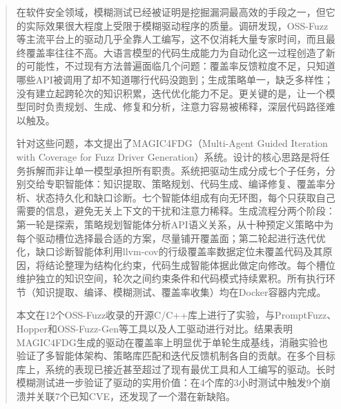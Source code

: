 \documentclass[
    fontset = mac %
  ]{njuthesis}
\begin{document}

\maketitle

\raggedbottom

\begin{abstract}
在软件安全领域，模糊测试已经被证明是挖掘漏洞最高效的手段之一，但它的实际效果很大程度上受限于模糊驱动程序的质量。调研发现，OSS-Fuzz等主流平台上的驱动几乎全靠人工编写，这不仅消耗大量专家时间，而且最终覆盖率往往不高。大语言模型的代码生成能力为自动化这一过程创造了新的可能性，不过现有方法普遍面临几个问题：覆盖率反馈粒度不足，只知道哪些API被调用了却不知道哪行代码没跑到；生成策略单一，缺乏多样性；没有建立起跨轮次的知识积累，迭代优化能力不足。更关键的是，让一个模型同时负责规划、生成、修复和分析，注意力容易被稀释，深层代码路径难以触及。

针对这些问题，本文提出了MAGIC4FDG（Multi-Agent Guided Iteration with Coverage for Fuzz Driver Generation）系统。设计的核心思路是将任务拆解而非让单一模型承担所有职责。系统把驱动生成分成七个子任务，分别交给专职智能体：知识提取、策略规划、代码生成、编译修复、覆盖率分析、状态持久化和缺口诊断。七个智能体组成有向无环图，每个只获取自己需要的信息，避免无关上下文的干扰和注意力稀释。生成流程分两个阶段：第一轮是探索，策略规划智能体分析API语义关系，从十种预定义策略中为每个驱动槽位选择最合适的方案，尽量铺开覆盖面；第二轮起进行迭代优化，缺口诊断智能体利用llvm-cov的行级覆盖率数据定位未覆盖代码及其原因，将结论整理为结构化约束，代码生成智能体据此做定向修改。每个槽位维护独立的知识空间，轮次之间约束条件和代码模式持续累积。所有执行环节（知识提取、编译、模糊测试、覆盖率收集）均在Docker容器内完成。

本文在12个OSS-Fuzz收录的开源C/C++库上进行了实验，与PromptFuzz、Hopper和OSS-Fuzz-Gen等工具以及人工驱动进行对比。结果表明MAGIC4FDG生成的驱动在覆盖率上明显优于单轮生成基线，消融实验也验证了多智能体架构、策略库匹配和迭代反馈机制各自的贡献。在多个目标库上，系统的表现已接近甚至超过了现有最优工具和人工编写的驱动。长时模糊测试进一步验证了驱动的实用价值：在4个库的3小时测试中触发9个崩溃并关联7个已知CVE，还发现了一个潜在新缺陷。
\end{abstract}
\end{document}
